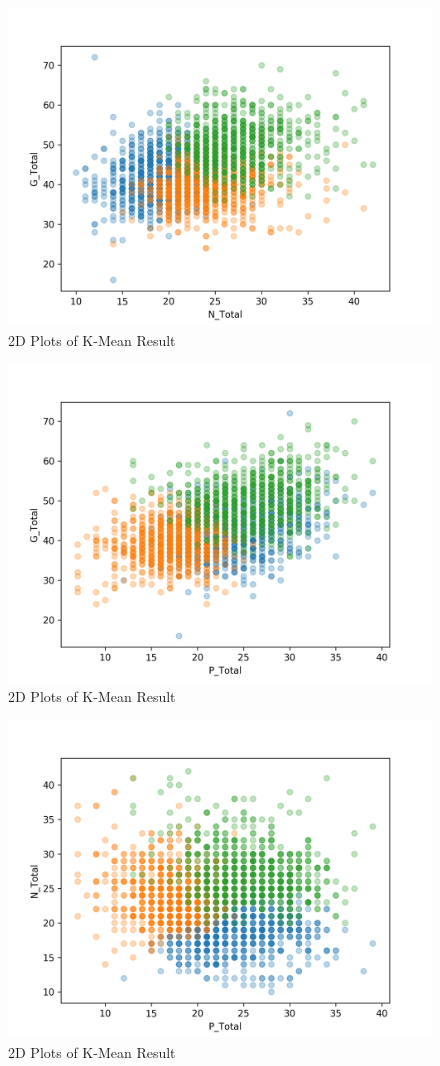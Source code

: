 \documentclass[11pt]{article}
\begin{document}
	\begin{figure}[H]
		\centering
		\includegraphics[width=0.7\linewidth]{figures/3_means_N_Total_G_Total.png}
		\caption{2D Plots of K-Mean Result}
	\end{figure}
	\begin{figure}[H]
	\centering
		\includegraphics[width=0.7\linewidth]{figures/3_means_P_Total_G_Total.png}
		\caption{2D Plots of K-Mean Result}
	\end{figure}
	\begin{figure}[H]
		\centering
		\includegraphics[width=0.7\linewidth]{figures/3_means_P_Total_N_Total.png}
		\caption{2D Plots of K-Mean Result}
	\end{figure}
\end{document}
